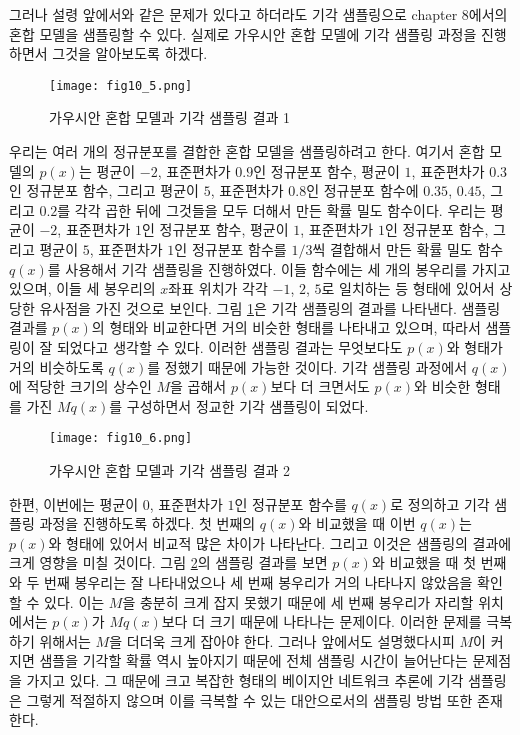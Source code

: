 \documentclass[a4paper]{oblivoir}
\begin{document}
그러나 설령 앞에서와 같은 문제가 있다고 하더라도 기각 샘플링으로 chapter 8에서의 혼합 모델을 샘플링할 수 있다. 실제로 가우시안 혼합 모델에 기각 샘플링 과정을 진행하면서 그것을 알아보도록 하겠다.  

\begin{figure}[ht] \centering 
\texttt{[image: fig10\_5.png]} 
\caption{가우시안 혼합 모델과 기각 샘플링 결과 1}
\label{fig:10-5}
\end{figure}  

우리는 여러 개의 정규분포를 결합한 혼합 모델을 샘플링하려고 한다. 여기서 혼합 모델의 $p(x)$는 평균이 $-2$, 표준편차가 $0.9$인 정규분포 함수, 평균이 $1$, 표준편차가 $0.3$인 정규분포 함수, 그리고 평균이 $5$, 표준편차가 $0.8$인 정규분포 함수에 $0.35$, $0.45$, 그리고 $0.2$를 각각 곱한 뒤에 그것들을 모두 더해서 만든 확률 밀도 함수이다. 우리는 평균이 $-2$, 표준편차가 $1$인 정규분포 함수, 평균이 $1$, 표준편차가 $1$인 정규분포 함수, 그리고 평균이 $5$, 표준편차가 $1$인 정규분포 함수를 $1/3$씩 결합해서 만든 확률 밀도 함수 $q(x)$를 사용해서 기각 샘플링을 진행하였다. 이들 함수에는 세 개의 봉우리를 가지고 있으며, 이들 세 봉우리의 $x$좌표 위치가 각각 $-1$, $2$, $5$로 일치하는 등 형태에 있어서 상당한 유사점을 가진 것으로 보인다. 그림 \ref{fig:10-5}은 기각 샘플링의 결과를 나타낸다. 샘플링 결과를 $p(x)$의 형태와 비교한다면 거의 비슷한 형태를 나타내고 있으며, 따라서 샘플링이 잘 되었다고 생각할 수 있다. 이러한 샘플링 결과는 무엇보다도 $p(x)$와 형태가 거의 비슷하도록 $q(x)$를 정했기 때문에 가능한 것이다. 기각 샘플링 과정에서 $q(x)$에 적당한 크기의 상수인 $M$을 곱해서 $p(x)$보다 더 크면서도 $p(x)$와 비슷한 형태를 가진 $Mq(x)$를 구성하면서 정교한 기각 샘플링이 되었다. \\

\begin{figure}[ht] \centering 
\texttt{[image: fig10\_6.png]} 
\caption{가우시안 혼합 모델과 기각 샘플링 결과 2}
\label{fig:10-6}
\end{figure}  

한편, 이번에는 평균이 $0$, 표준편차가 $1$인 정규분포 함수를 $q(x)$로 정의하고 기각 샘플링 과정을 진행하도록 하겠다. 첫 번째의 $q(x)$와 비교했을 때 이번 $q(x)$는 $p(x)$와 형태에 있어서 비교적 많은 차이가 나타난다. 그리고 이것은 샘플링의 결과에 크게 영향을 미칠 것이다. 그림 \ref{fig:10-6}의 샘플링 결과를 보면 $p(x)$와 비교했을 때 첫 번째와 두 번째 봉우리는 잘 나타내었으나 세 번째 봉우리가 거의 나타나지 않았음을 확인할 수 있다. 이는 $M$을 충분히 크게 잡지 못했기 때문에 세 번째 봉우리가 자리할 위치에서는 $p(x)$가 $Mq(x)$보다 더 크기 때문에 나타나는 문제이다. 이러한 문제를 극복하기 위해서는 $M$을 더더욱 크게 잡아야 한다. 그러나 앞에서도 설명했다시피 $M$이 커지면 샘플을 기각할 확률 역시 높아지기 때문에 전체 샘플링 시간이 늘어난다는 문제점을 가지고 있다. 그 때문에 크고 복잡한 형태의 베이지안 네트워크 추론에 기각 샘플링은 그렇게 적절하지 않으며 이를 극복할 수 있는 대안으로서의 샘플링 방법 또한 존재한다. 
\end{document}
